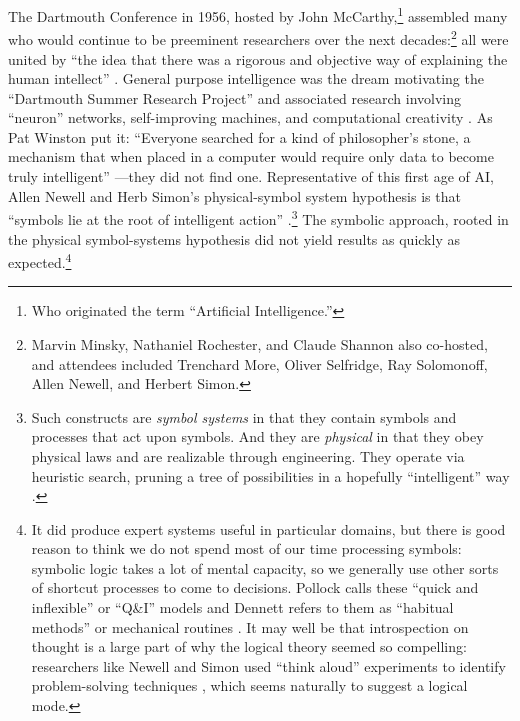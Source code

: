 The Dartmouth
Conference in 1956, hosted by John McCarthy,\footnote{Who originated
  the term ``Artificial Intelligence.''} assembled many who would continue to
be preeminent researchers over the next decades:\footnote{Marvin Minsky, Nathaniel Rochester, and
Claude Shannon also co-hosted, and attendees included Trenchard More, Oliver Selfridge,
Ray Solomonoff, Allen Newell, and Herbert Simon.} all were united by
``the idea that there was a rigorous and objective way of explaining
the human intellect'' \cite[Ch. 5]{mccorduck}. General purpose
intelligence was the dream motivating the ``Dartmouth Summer Research
Project'' and associated research involving ``neuron'' networks,
self-improving machines, and computational creativity
\cite{dartmouthconf}. As Pat Winston put it: ``Everyone searched for a kind of philosopher's stone,
a mechanism that when placed in a computer would require only data to
become truly intelligent'' \cite[p. 4]{winston}---they did not find one.
Representative of this first age of AI, Allen Newell and Herb Simon's
physical-symbol system hypothesis is that ``symbols lie at the root of 
intelligent action'' \cite[p. 109]{newellsimon}.\footnote{Such
constructs are \emph{symbol systems} in that they contain symbols and processes
that act upon symbols. And they are \emph{physical} in that they obey
physical laws and are realizable through engineering. They operate via
heuristic search, pruning a tree of possibilities in a hopefully
``intelligent'' way \cite[p. 124]{newellsimon}.} The symbolic
approach, rooted in the physical symbol-systems hypothesis did not
yield results as quickly as expected.\footnote{It did produce
  expert systems useful in particular domains, but there is good
  reason to think we do not spend most of our time processing symbols:
  symbolic logic takes a lot of mental capacity, so we generally use
  other sorts of shortcut processes to come to decisions. Pollock
  calls these ``quick and inflexible'' or ``Q\&I'' models \cite[p.
    120]{pollock} and Dennett refers to them as ``habitual methods''
  or mechanical routines \cite[p. 157]{dennett}.
It may well be that introspection on thought is a large part of why the logical theory seemed so
compelling: researchers like Newell and Simon used ``think aloud''
experiments to identify problem-solving techniques \cite[Ch.
  10]{mccorduck}, which seems naturally to suggest a logical mode.} 

